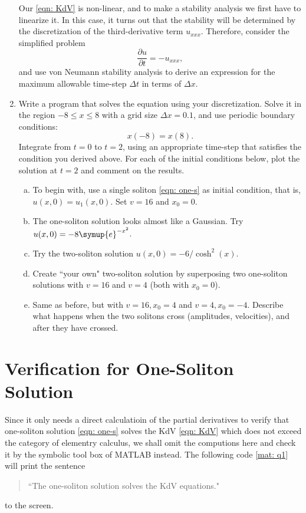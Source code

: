 \documentclass{assignment}[2019/10/15]
\newcommand{\me}{\symup{e}}
\begin{document}
\begin{enumerate}[1)]
        Our \ref{eqn: KdV} is non-linear, and to make a stability analysis we first have to linearize it. In this case, it turns out that the stability will be determined by the discretization of the third-derivative term $u_{xxx}$. Therefore, consider the simplified problem
        \begin{equation}
            \frac{\partial u}{\partial t} = - u_{xxx},
        \end{equation}
        and use von Neumann stability analysis to derive an expression for the maximum allowable time-step $\Delta t$ in terms of $\Delta x$.
        \item Write a program that solves the equation using your discretization. Solve it in the region $-8\leq x\leq 8$ with a grid size $\Delta x=0.1$, and use periodic boundary conditions:
        \begin{equation}
            x(-8) = x(8).
        \end{equation}
        Integrate from $t=0$ to $t=2$, using an appropriate time-step that satisfies the condition you derived above. For each of the initial conditions below, plot the solution at $t=2$ and comment on the results.
        \begin{enumerate}[a.]
            \item To begin with, use a single soliton \ref{eqn: one-s} as initial condition, that is, $u(x, 0) = u_1(x, 0)$. Set $v=16$ and $x_0 = 0$.
            \item The one-soliton solution looks almost like a Gaussian. Try $u(x, 0)=-8\me^{-x^2}$.
            \item Try the two-soliton solution $u(x, 0) = -6/\cosh^2(x)$.
            \item Create ``your own" two-soliton solution by superposing two one-soliton solutions with $v=16$ and $v=4$ (both with $x_0=0$).
            \item Same as before, but with $v=16, x_0=4$ and $v=4, x_0=-4$. Describe what happens when the two solitons cross (amplitudes, velocities), and after they have crossed.
        \end{enumerate}
    \end{enumerate}

    \section{Verification for One-Soliton Solution}

    Since it only needs a direct calculatioin of the partial derivatives to verify that one-soliton solution \ref{eqn: one-s} solves the KdV \ref{eqn: KdV} which does not exceed the category of elementry calculus, we shall omit the computions here and check it by the symbolic tool box of MATLAB instead. The following code \ref{mat: q1} will print the sentence
    \begin{quote}
        ``The one-soliton solution solves the KdV equations."
    \end{quote}
    to the screen.
\end{document}
